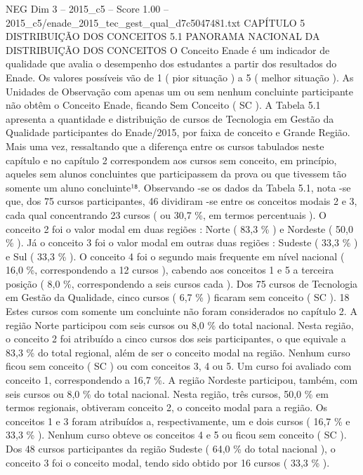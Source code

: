 \begin{textsample}{NEG Dim 3 – 2015\_c5 – Score 1.00 – 2015\_c5/enade\_2015\_tec\_gest\_qual\_d7c5047481.txt}  \label{ex:f3_neg_063}
CAPÍTULO 5 DISTRIBUIÇÃO DOS CONCEITOS 5.1 PANORAMA NACIONAL DA DISTRIBUIÇÃO DOS CONCEITOS O Conceito Enade é um indicador de qualidade que avalia o desempenho dos estudantes a partir dos resultados do Enade.
Os valores possíveis vão de 1 ( pior situação ) a 5 ( melhor situação ).
As Unidades de Observação com apenas um ou sem nenhum concluinte participante não obtêm o Conceito Enade, ficando Sem Conceito ( SC ).
A Tabela 5.1 apresenta a quantidade e distribuição de cursos de Tecnologia em Gestão da Qualidade participantes do Enade/2015, por faixa de conceito e Grande Região.
Mais uma vez, ressaltando que a diferença entre os cursos tabulados neste capítulo e no capítulo 2 correspondem aos cursos sem conceito, em princípio, aqueles sem alunos concluintes que participassem da prova ou que tivessem tão somente um aluno concluinte¹⁸.
Observando -se os dados da Tabela 5.1, nota -se que, dos 75 cursos participantes, 46 dividiram -se entre os conceitos modais 2 e 3, cada qual concentrando 23 cursos ( ou 30,7 \%, em termos percentuais ).
O conceito 2 foi o valor modal em duas regiões : Norte ( 83,3 \% ) e Nordeste ( 50,0 \% ).
Já o conceito 3 foi o valor modal em outras duas regiões : Sudeste ( 33,3 \% ) e Sul ( 33,3 \% ).
O conceito 4 foi o segundo mais frequente em nível nacional ( 16,0 \%, correspondendo a 12 cursos ), cabendo aos conceitos 1 e 5 a terceira posição ( 8,0 \%, correspondendo a seis cursos cada ).
Dos 75 cursos de Tecnologia em Gestão da Qualidade, cinco cursos ( 6,7 \% ) ficaram sem conceito ( SC ). 18 Estes cursos com somente um concluinte não foram considerados no capítulo 2.
A região Norte participou com seis cursos ou 8,0 \% do total nacional.
Nesta região, o conceito 2 foi atribuído a cinco cursos dos seis participantes, o que equivale a 83,3 \% do total regional, além de ser o conceito modal na região.
Nenhum curso ficou sem conceito ( SC ) ou com conceitos 3, 4 ou 5.
Um curso foi avaliado com conceito 1, correspondendo a 16,7 \%.
A região Nordeste participou, também, com seis cursos ou 8,0 \% do total nacional.
Nesta região, três cursos, 50,0 \% em termos regionais, obtiveram conceito 2, o conceito modal para a região.
Os conceitos 1 e 3 foram atribuídos a, respectivamente, um e dois cursos ( 16,7 \% e 33,3 \% ).
Nenhum curso obteve os conceitos 4 e 5 ou ficou sem conceito ( SC ).
Dos 48 cursos participantes da região Sudeste ( 64,0 \% do total nacional ), o conceito 3 foi o conceito modal, tendo sido obtido por 16 cursos ( 33,3 \% ).

\end{textsample}
